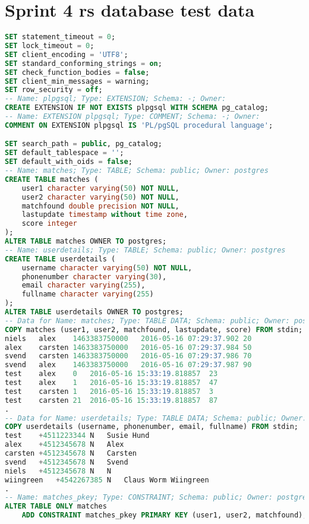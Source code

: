 \chapter{Sprint 4 \gls{rs} database test data}
\label{app:datadump}
\begin{lstlisting}[language=SQL]
SET statement_timeout = 0;
SET lock_timeout = 0;
SET client_encoding = 'UTF8';
SET standard_conforming_strings = on;
SET check_function_bodies = false;
SET client_min_messages = warning;
SET row_security = off;
-- Name: plpgsql; Type: EXTENSION; Schema: -; Owner: 
CREATE EXTENSION IF NOT EXISTS plpgsql WITH SCHEMA pg_catalog;
-- Name: EXTENSION plpgsql; Type: COMMENT; Schema: -; Owner: 
COMMENT ON EXTENSION plpgsql IS 'PL/pgSQL procedural language';

SET search_path = public, pg_catalog;
SET default_tablespace = '';
SET default_with_oids = false;
-- Name: matches; Type: TABLE; Schema: public; Owner: postgres
CREATE TABLE matches (
    user1 character varying(50) NOT NULL,
    user2 character varying(50) NOT NULL,
    matchfound double precision NOT NULL,
    lastupdate timestamp without time zone,
    score integer
);
ALTER TABLE matches OWNER TO postgres;
-- Name: userdetails; Type: TABLE; Schema: public; Owner: postgres
CREATE TABLE userdetails (
    username character varying(50) NOT NULL,
    phonenumber character varying(30),
    email character varying(255),
    fullname character varying(255)
);
ALTER TABLE userdetails OWNER TO postgres;
-- Data for Name: matches; Type: TABLE DATA; Schema: public; Owner: postgres
COPY matches (user1, user2, matchfound, lastupdate, score) FROM stdin;
niels   alex    1463383750000   2016-05-16 07:29:37.902 20
alex    carsten 1463383750000   2016-05-16 07:29:37.984 50
svend   carsten 1463383750000   2016-05-16 07:29:37.986 70
svend   alex    1463383750000   2016-05-16 07:29:37.987 90
test    alex    0   2016-05-16 15:33:19.818857  23
test    alex    1   2016-05-16 15:33:19.818857  47
test    carsten 1   2016-05-16 15:33:19.818857  3
test    carsten 21  2016-05-16 15:33:19.818857  87
.
-- Data for Name: userdetails; Type: TABLE DATA; Schema: public; Owner: postgres
COPY userdetails (username, phonenumber, email, fullname) FROM stdin;
test    +4511223344 N   Susie Hund
alex    +4512345678 N   Alex
carsten +4512345678 N   Carsten
svend   +4512345678 N   Svend
niels   +4512345678 N   N
wiingreen   +4542267385 N   Claus Worm Wiingreen
.
-- Name: matches_pkey; Type: CONSTRAINT; Schema: public; Owner: postgres
ALTER TABLE ONLY matches
    ADD CONSTRAINT matches_pkey PRIMARY KEY (user1, user2, matchfound);

\end{lstlisting}
